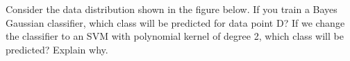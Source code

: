 Consider the data distribution shown in the figure below. If you train a Bayes Gaussian classifier, which class will be predicted for data point D? If we change the classifier to an SVM with polynomial kernel of degree 2, which class will be predicted? Explain why.


